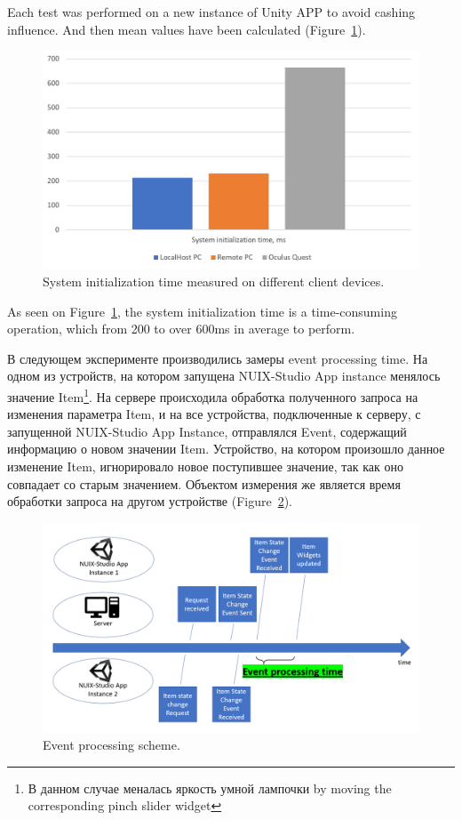 Each test was performed on a new instance of Unity APP to avoid cashing influence. And then mean values have been calculated (Figure~\ref{fig:SystemInitTime-figure}).

\begin{figure}
  \centering
  \includegraphics[width=0.9\linewidth]{figures/SystemInitTime.png}
  \caption{System initialization time measured on different client devices.}
  \label{fig:SystemInitTime-figure}
\end{figure}

As seen on Figure~\ref{fig:SystemInitTime-figure}, the system initialization time is a time-consuming operation, which from 200 to over 600ms in average to perform.

В следующем эксперименте производились замеры event processing time. На одном из устройств, на котором запущена NUIX-Studio App instance менялось значение Item\footnote{В данном случае меналась яркость умной лампочки by moving the corresponding pinch slider widget}. На сервере происходила обработка полученного запроса на изменения параметра Item, и на все устройства, подключенные к серверу, с запущенной NUIX-Studio App Instance, отправлялся Event, содержащий информацию о новом значении Item. Устройство, на котором произошло данное изменение Item, игнорировало новое поступившее значение, так как оно совпадает со старым значением. Объектом измерения же является время обработки запроса на другом устройстве (Figure~\ref{fig:EventProcessingScheme-figure}).

\begin{figure}
  \centering
  \includegraphics[width=0.9\linewidth]{figures/EventProcessingScheme.png}
  \caption{Event processing scheme.}
  \label{fig:EventProcessingScheme-figure}
\end{figure}

